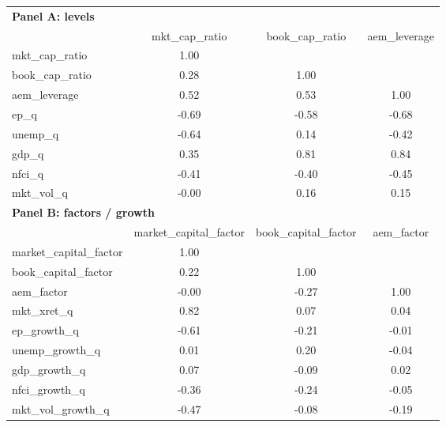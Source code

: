 \begin{tabular}{lccc}
\hline\hline
\multicolumn{4}{l}{\textbf{Panel A: levels}} \\
 & mkt_cap_ratio & book_cap_ratio & aem_leverage \\
\hline
mkt_cap_ratio & 1.00 &  &  \\
book_cap_ratio & 0.28 & 1.00 &  \\
aem_leverage & 0.52 & 0.53 & 1.00 \\
ep_q & -0.69 & -0.58 & -0.68 \\
unemp_q & -0.64 & 0.14 & -0.42 \\
gdp_q & 0.35 & 0.81 & 0.84 \\
nfci_q & -0.41 & -0.40 & -0.45 \\
mkt_vol_q & -0.00 & 0.16 & 0.15 \\
\hline
\multicolumn{4}{l}{\textbf{Panel B: factors / growth}} \\
 & market_capital_factor & book_capital_factor & aem_factor \\
\hline
market_capital_factor & 1.00 &  &  \\
book_capital_factor & 0.22 & 1.00 &  \\
aem_factor & -0.00 & -0.27 & 1.00 \\
mkt_xret_q & 0.82 & 0.07 & 0.04 \\
ep_growth_q & -0.61 & -0.21 & -0.01 \\
unemp_growth_q & 0.01 & 0.20 & -0.04 \\
gdp_growth_q & 0.07 & -0.09 & 0.02 \\
nfci_growth_q & -0.36 & -0.24 & -0.05 \\
mkt_vol_growth_q & -0.47 & -0.08 & -0.19 \\
\hline\hline
\end{tabular}

